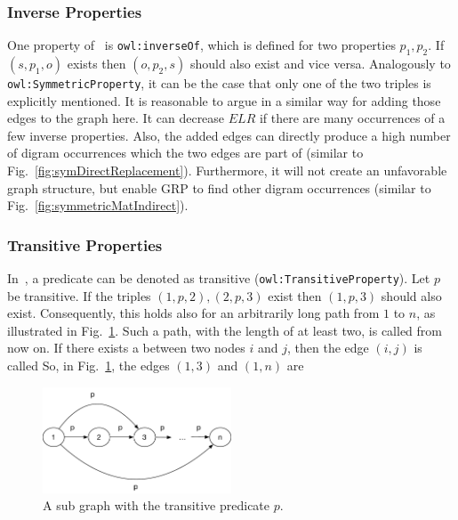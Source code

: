 \subsubsection{Inverse Properties}\label{sec:approachInverse}

One property of~\cite{owl} is {\tt owl:inverseOf}, which is defined for two properties $p_1, p_2$. If $(s,p_1,o)$ exists then $(o,p_2,s)$ should also exist and vice versa. Analogously to {\tt owl:SymmetricProperty}, it can be the case that only one of the two triples is explicitly mentioned. It is reasonable to argue in a similar way for adding those edges to the graph here. It can decrease $ELR$ if there are many occurrences of a few inverse properties. Also, the added edges can directly produce a high number of digram occurrences which the two edges are part of (similar to Fig.~\ref{fig:symDirectReplacement}). Furthermore, it will not create an unfavorable graph structure, but enable GRP to find other digram occurrences (similar to Fig.~\ref{fig:symmetricMatIndirect}).


\subsubsection{Transitive Properties}\label{sec:approachTransitive}

In~\cite{owl}, a predicate can be denoted as transitive ({\tt owl:TransitiveProperty}). Let $p$ be transitive. If the triples $(1,p,2),(2,p,3)$ exist then $(1,p,3)$ should also exist. Consequently, this holds also for an arbitrarily long path from $1$ to $n$, as illustrated in Fig.~\ref{fig:transitiveMat}. Such a path, with the length of at least two, is called \tp from now on. If there exists a \tp between two nodes $i$ and $j$, then the edge $(i,j)$ is called \dtpp So, in Fig.~\ref{fig:transitiveMat}, the edges $(1,3)$ and $(1,n)$ are \dtpsp

\begin{figure}[h]
	\centering
	\includegraphics[width=0.5\textwidth]{figures/approach/transitiveMat}
	\caption{A sub graph with the transitive predicate $p$.}
	\label{fig:transitiveMat}
\end{figure}

